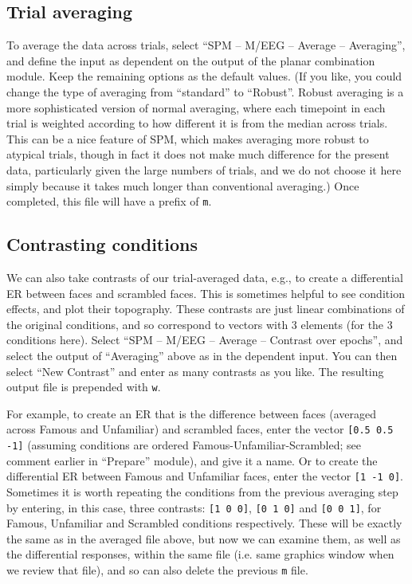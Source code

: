 \subsection{Trial averaging}

To average the data across trials, select ``SPM -- M/EEG -- Average -- Averaging'', and define the input as dependent on the output of the planar combination module. Keep the remaining options as the default values. (If you like, you could change the type of averaging from ``standard'' to ``Robust''. Robust averaging is a more sophisticated version of normal averaging, where each timepoint in each trial is weighted according to how different it is from the median across trials. This can be a nice feature of SPM, which makes averaging more robust to atypical trials, though in fact it does not make much difference for the present data, particularly given the large numbers of trials, and we do not choose it here simply because it takes much longer than conventional averaging.) Once completed, this file will have a prefix of \texttt{m}.

\subsection{Contrasting conditions}

We can also take contrasts of our trial-averaged data, e.g., to create a differential ER between faces and scrambled faces. This is sometimes helpful to see condition effects, and plot their topography. These contrasts are just linear combinations of the original conditions, and so correspond to vectors with 3 elements (for the 3 conditions here). Select ``SPM -- M/EEG -- Average -- Contrast over epochs'', and select the output of ``Averaging'' above as in the dependent input. You can then select ``New Contrast'' and enter as many contrasts as you like. The resulting output file is prepended with \texttt{w}.

For example, to create an ER that is the difference between faces (averaged across Famous and Unfamiliar) and scrambled faces, enter the vector \verb|[0.5 0.5 -1]| (assuming conditions are ordered Famous-Unfamiliar-Scrambled; see comment earlier in ``Prepare'' module), and give it a name. Or to create the differential ER between Famous and Unfamiliar faces, enter the vector \verb|[1 -1 0]|. Sometimes it is worth repeating the conditions from the previous averaging step by entering, in this case, three contrasts: \verb|[1 0 0]|, \verb|[0 1 0]| and \verb|[0 0 1]|, for Famous, Unfamiliar and Scrambled conditions respectively. These will be exactly the same as in the averaged file above, but now we can examine them, as well as the differential responses, within the same file (i.e. same graphics window when we review that file), and so can also delete the previous \texttt{m} file.


